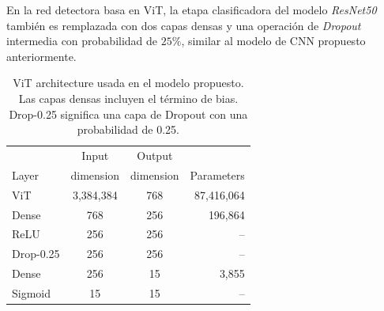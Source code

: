 {En la red detectora basa en ViT, la etapa clasificadora del modelo \textit{ResNet50} también es
remplazada con dos capas densas y una operación de \textit{Dropout} intermedia con probabilidad
de $25\%$, similar al modelo de CNN propuesto anteriormente.

\begin{table}[!ht]
    \centering
    \begin{tabular}{| l|c | c | r |}
    \hline
                 &     Input   &  Output    &  \\
    Layer        &   dimension & dimension  & Parameters \\
    \hline\hline
    ViT     &     3,384,384 &     768 & 87,416,064 \\
    Dense        &     768        &     256      & 196,864    \\
    ReLU         &     256         &     256      & --         \\
    Drop-0.25  &     256         &     256      & --         \\
    Dense        &     256         &     15       &  3,855     \\
    Sigmoid      &     15          &     15       & --         \\
    \hline
    \end{tabular}
    \caption{ViT architecture usada en el modelo propuesto. Las capas densas incluyen el término de bias.
    Drop-0.25 significa una capa de Dropout con una probabilidad de 0.25.}
    \label{table_ViT}
\end{table}

}
